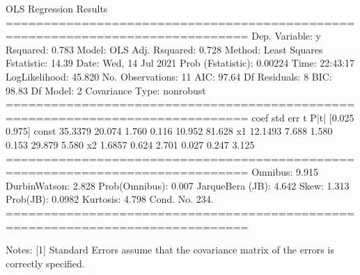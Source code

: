 \documentclass[letterpaper,10pt,english]{jupyterBook}
\begin{document}
\begin{sphinxVerbatim}[commandchars=\\\{\}]
\end{sphinxVerbatim}

\begin{sphinxVerbatim}[commandchars=\\\{\}]
                            OLS Regression Results                            
==============================================================================
Dep. Variable:                      y   R\PYGZhy{}squared:                       0.783
Model:                            OLS   Adj. R\PYGZhy{}squared:                  0.728
Method:                 Least Squares   F\PYGZhy{}statistic:                     14.39
Date:                Wed, 14 Jul 2021   Prob (F\PYGZhy{}statistic):            0.00224
Time:                        22:43:17   Log\PYGZhy{}Likelihood:                \PYGZhy{}45.820
No. Observations:                  11   AIC:                             97.64
Df Residuals:                       8   BIC:                             98.83
Df Model:                           2                                         
Covariance Type:            nonrobust                                         
==============================================================================
                 coef    std err          t      P\PYGZgt{}|t|      [0.025      0.975]
\PYGZhy{}\PYGZhy{}\PYGZhy{}\PYGZhy{}\PYGZhy{}\PYGZhy{}\PYGZhy{}\PYGZhy{}\PYGZhy{}\PYGZhy{}\PYGZhy{}\PYGZhy{}\PYGZhy{}\PYGZhy{}\PYGZhy{}\PYGZhy{}\PYGZhy{}\PYGZhy{}\PYGZhy{}\PYGZhy{}\PYGZhy{}\PYGZhy{}\PYGZhy{}\PYGZhy{}\PYGZhy{}\PYGZhy{}\PYGZhy{}\PYGZhy{}\PYGZhy{}\PYGZhy{}\PYGZhy{}\PYGZhy{}\PYGZhy{}\PYGZhy{}\PYGZhy{}\PYGZhy{}\PYGZhy{}\PYGZhy{}\PYGZhy{}\PYGZhy{}\PYGZhy{}\PYGZhy{}\PYGZhy{}\PYGZhy{}\PYGZhy{}\PYGZhy{}\PYGZhy{}\PYGZhy{}\PYGZhy{}\PYGZhy{}\PYGZhy{}\PYGZhy{}\PYGZhy{}\PYGZhy{}\PYGZhy{}\PYGZhy{}\PYGZhy{}\PYGZhy{}\PYGZhy{}\PYGZhy{}\PYGZhy{}\PYGZhy{}\PYGZhy{}\PYGZhy{}\PYGZhy{}\PYGZhy{}\PYGZhy{}\PYGZhy{}\PYGZhy{}\PYGZhy{}\PYGZhy{}\PYGZhy{}\PYGZhy{}\PYGZhy{}\PYGZhy{}\PYGZhy{}\PYGZhy{}\PYGZhy{}
const         35.3379     20.074      1.760      0.116     \PYGZhy{}10.952      81.628
x1           \PYGZhy{}12.1493      7.688     \PYGZhy{}1.580      0.153     \PYGZhy{}29.879       5.580
x2             1.6857      0.624      2.701      0.027       0.247       3.125
==============================================================================
Omnibus:                        9.915   Durbin\PYGZhy{}Watson:                   2.828
Prob(Omnibus):                  0.007   Jarque\PYGZhy{}Bera (JB):                4.642
Skew:                           1.313   Prob(JB):                       0.0982
Kurtosis:                       4.798   Cond. No.                         234.
==============================================================================

Notes:
[1] Standard Errors assume that the covariance matrix of the errors is correctly specified.
\end{sphinxVerbatim}
\end{document}

